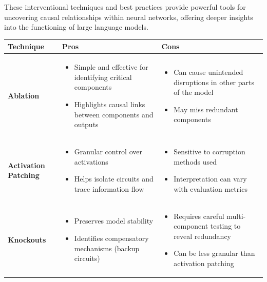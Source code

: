 \documentclass[sigconf,authoryear]{acmart}
\begin{document}
  These interventional techniques and best practices provide powerful tools for uncovering causal relationships within neural networks, offering deeper insights into the functioning of large language models.
\begin{table}[h]
  \centering
  \footnotesize
  \begin{tabular}{|p{2.5cm}|p{2.5cm}|p{3cm}|}
  \hline
  \textbf{Technique} & \textbf{Pros} & \textbf{Cons} \\
  \hline
  \textbf{Ablation} & 
    \begin{itemize}
      \item Simple and effective for identifying critical components
      \item Highlights causal links between components and outputs
    \end{itemize} &
    \begin{itemize}
      \item Can cause unintended disruptions in other parts of the model
      \item May miss redundant components
    \end{itemize} \\
  \hline
  \textbf{Activation Patching} & 
    \begin{itemize}
      \item Granular control over activations
      \item Helps isolate circuits and trace information flow
    \end{itemize} &
    \begin{itemize}
      \item Sensitive to corruption methods used
      \item Interpretation can vary with evaluation metrics
    \end{itemize} \\
  \hline
  \textbf{Knockouts} & 
    \begin{itemize}
      \item Preserves model stability
      \item Identifies compensatory mechanisms (backup circuits)
    \end{itemize} &
    \begin{itemize}
      \item Requires careful multi-component testing to reveal redundancy
      \item Can be less granular than activation patching
    \end{itemize} \\

\end{tabular}
\end{table}
\end{document}
